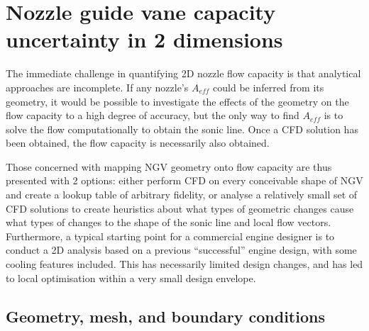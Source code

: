 \documentclass[a4paper, 11pt, oneside]{report}
\begin{document}
\section{Nozzle guide vane capacity uncertainty in 2 dimensions}
\label{section_1d_vs_2d_capacity_uncertainty}

The immediate challenge in quantifying 2D nozzle flow capacity is that analytical approaches are incomplete. If any nozzle's $A_{eff}$ could be inferred from its geometry, it would be possible to investigate the effects of the geometry on the flow capacity to a high degree of accuracy, but the only way to find $A_{eff}$ is to solve the flow computationally to obtain the sonic line. Once a CFD solution has been obtained, the flow capacity is necessarily also obtained. 

Those concerned with mapping NGV geometry onto flow capacity are thus presented with 2 options: either perform CFD on every conceivable shape of NGV and create a lookup table of arbitrary fidelity, or analyse a relatively small set of CFD solutions to create heuristics about what types of geometric changes cause what types of changes to the shape of the sonic line and local flow vectors. Furthermore, a typical starting point for a commercial engine designer is to conduct a 2D analysis based on a previous ``successful'' engine design, with some cooling features included. This has necessarily limited design changes, and has led to local optimisation within a very small design envelope.

\subsection{Geometry, mesh, and boundary conditions}
\end{document}
